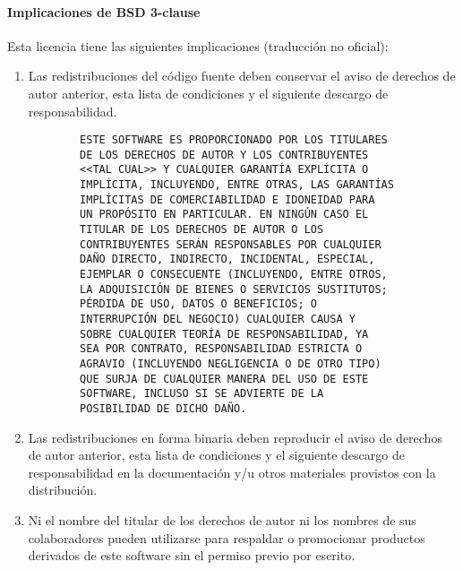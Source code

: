 \paragraph{Implicaciones de BSD 3-clause} Esta licencia tiene las siguientes implicaciones
(traducción no oficial)\cite{bsd}:
\begin{enumerate}
    \item Las redistribuciones del código fuente deben conservar el aviso de
    derechos de autor anterior, esta lista de condiciones y el siguiente
    descargo de responsabilidad.
    \begin{verbatim}
        ESTE SOFTWARE ES PROPORCIONADO POR LOS TITULARES 
        DE LOS DERECHOS DE AUTOR Y LOS CONTRIBUYENTES 
        <<TAL CUAL>> Y CUALQUIER GARANTÍA EXPLÍCITA O
        IMPLÍCITA, INCLUYENDO, ENTRE OTRAS, LAS GARANTÍAS
        IMPLÍCITAS DE COMERCIABILIDAD E IDONEIDAD PARA 
        UN PROPÓSITO EN PARTICULAR. EN NINGÚN CASO EL 
        TITULAR DE LOS DERECHOS DE AUTOR O LOS 
        CONTRIBUYENTES SERÁN RESPONSABLES POR CUALQUIER 
        DAÑO DIRECTO, INDIRECTO, INCIDENTAL, ESPECIAL, 
        EJEMPLAR O CONSECUENTE (INCLUYENDO, ENTRE OTROS, 
        LA ADQUISICIÓN DE BIENES O SERVICIOS SUSTITUTOS;
        PÉRDIDA DE USO, DATOS O BENEFICIOS; O 
        INTERRUPCIÓN DEL NEGOCIO) CUALQUIER CAUSA Y 
        SOBRE CUALQUIER TEORÍA DE RESPONSABILIDAD, YA 
        SEA POR CONTRATO, RESPONSABILIDAD ESTRICTA O 
        AGRAVIO (INCLUYENDO NEGLIGENCIA O DE OTRO TIPO)
        QUE SURJA DE CUALQUIER MANERA DEL USO DE ESTE 
        SOFTWARE, INCLUSO SI SE ADVIERTE DE LA 
        POSIBILIDAD DE DICHO DAÑO.
    \end{verbatim}
    \item Las redistribuciones en forma binaria deben reproducir el aviso de
    derechos de autor anterior, esta lista de condiciones y el siguiente
    descargo de responsabilidad en la documentación y/u otros materiales
    provistos con la distribución.
    \item Ni el nombre del titular de los derechos de autor ni los nombres de
    sus colaboradores pueden utilizarse para respaldar o promocionar productos
    derivados de este software sin el permiso previo por escrito.
\end{enumerate}